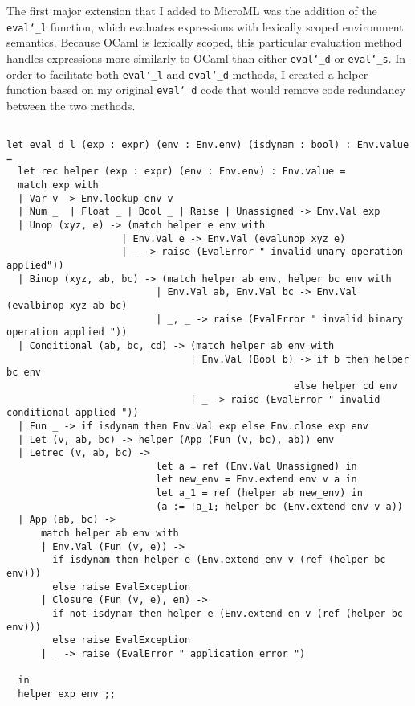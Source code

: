 \documentclass{article}
\begin{document}
The first major extension that I added to MicroML was the addition of the \texttt{eval\char`_l} function, which evaluates expressions with lexically scoped environment semantics. Because OCaml is lexically scoped, this particular evaluation method handles expressions more similarly to OCaml than either \texttt{eval\char`_d} or \texttt{eval\char`_s}. In order to facilitate both \texttt{eval\char`_l} and \texttt{eval\char`_d} methods, I created a helper function based on my original \texttt{eval\char`_d} code that would remove code redundancy between the two methods. 
\begin{verbatim}

let eval_d_l (exp : expr) (env : Env.env) (isdynam : bool) : Env.value = 
  let rec helper (exp : expr) (env : Env.env) : Env.value =
  match exp with 
  | Var v -> Env.lookup env v 
  | Num _  | Float _ | Bool _ | Raise | Unassigned -> Env.Val exp
  | Unop (xyz, e) -> (match helper e env with 
                    | Env.Val e -> Env.Val (evalunop xyz e)
                    | _ -> raise (EvalError " invalid unary operation applied"))
  | Binop (xyz, ab, bc) -> (match helper ab env, helper bc env with 
                          | Env.Val ab, Env.Val bc -> Env.Val (evalbinop xyz ab bc) 
                          | _, _ -> raise (EvalError " invalid binary operation applied "))
  | Conditional (ab, bc, cd) -> (match helper ab env with 
                                | Env.Val (Bool b) -> if b then helper bc env 
                                                  else helper cd env 
                                | _ -> raise (EvalError " invalid conditional applied "))
  | Fun _ -> if isdynam then Env.Val exp else Env.close exp env
  | Let (v, ab, bc) -> helper (App (Fun (v, bc), ab)) env
  | Letrec (v, ab, bc) -> 
                          let a = ref (Env.Val Unassigned) in
                          let new_env = Env.extend env v a in
                          let a_1 = ref (helper ab new_env) in
                          (a := !a_1; helper bc (Env.extend env v a))
  | App (ab, bc) -> 
      match helper ab env with 
      | Env.Val (Fun (v, e)) -> 
        if isdynam then helper e (Env.extend env v (ref (helper bc env)))
        else raise EvalException
      | Closure (Fun (v, e), en) -> 
        if not isdynam then helper e (Env.extend en v (ref (helper bc env)))
        else raise EvalException
      | _ -> raise (EvalError " application error ")

  in 
  helper exp env ;;
\end{verbatim}
\end{document}
